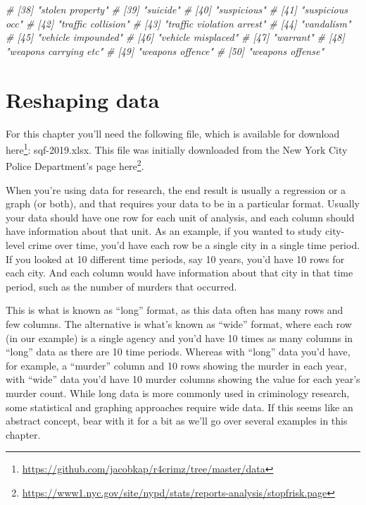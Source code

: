 \documentclass[
  a4paper,
]{krantz}
\makeatletter
\newenvironment{Shaded}{\begin{snugshade}}{\end{snugshade}}
\newcommand{\CommentTok}[1]{\textcolor[rgb]{0.56,0.35,0.01}{\textit{#1}}}
\renewcommand{\href}[2]{#2\footnote{\url{#1}}}
\newenvironment{kframe}{%
\medskip{}
\setlength{\fboxsep}{.8em}
 \def\at@end@of@kframe{}%
 \ifinner\ifhmode%
  \def\at@end@of@kframe{\end{minipage}}%
  \begin{minipage}{\columnwidth}%
 \fi\fi%
 \def\FrameCommand##1{\hskip\@totalleftmargin \hskip-\fboxsep
 \colorbox{shadecolor}{##1}\hskip-\fboxsep
     \hskip-\linewidth \hskip-\@totalleftmargin \hskip\columnwidth}%
 \MakeFramed {\advance\hsize-\width
   \@totalleftmargin\z@ \linewidth\hsize
   \@setminipage}}%
 {\par\unskip\endMakeFramed%
 \at@end@of@kframe}
\renewenvironment{Shaded}{\begin{kframe}}{\end{kframe}}
\makeatother
\begin{document}
\begin{Shaded}
\begin{Highlighting}[]
\CommentTok{\# [38] "stolen property"                           }
\CommentTok{\# [39] "suicide"                                   }
\CommentTok{\# [40] "suspicious"                                }
\CommentTok{\# [41] "suspicious occ"                            }
\CommentTok{\# [42] "traffic collision"                         }
\CommentTok{\# [43] "traffic violation arrest"                  }
\CommentTok{\# [44] "vandalism"                                 }
\CommentTok{\# [45] "vehicle impounded"                         }
\CommentTok{\# [46] "vehicle misplaced"                         }
\CommentTok{\# [47] "warrant"                                   }
\CommentTok{\# [48] "weapons carrying etc"                      }
\CommentTok{\# [49] "weapons offence"                           }
\CommentTok{\# [50] "weapons offense"}
\end{Highlighting}
\end{Shaded}

\hypertarget{reshaping}{%
\chapter{Reshaping data}\label{reshaping}}

For this chapter you'll need the following file, which is
available for download
\href{https://github.com/jacobkap/r4crimz/tree/master/data}{here}:
sqf-2019.xlsx. This file was initially downloaded from the
New York City Police Department's page
\href{https://www1.nyc.gov/site/nypd/stats/reports-analysis/stopfrisk.page}{here}.

When you're using data for research, the end result is
usually a regression or a graph (or both), and that requires
your data to be in a particular format. Usually your data
should have one row for each unit of analysis, and each
column should have information about that unit. As an
example, if you wanted to study city-level crime over time,
you'd have each row be a single city in a single time
period. If you looked at 10 different time periods, say 10
years, you'd have 10 rows for each city. And each column
would have information about that city in that time period,
such as the number of murders that occurred.

This is what is known as ``long'' format, as this data often
has many rows and few columns. The alternative is what's
known as ``wide'' format, where each row (in our example) is
a single agency and you'd have 10 times as many columns in
``long'' data as there are 10 time periods. Whereas with
``long'' data you'd have, for example, a ``murder'' column
and 10 rows showing the murder in each year, with ``wide''
data you'd have 10 murder columns showing the value for each
year's murder count. While long data is more commonly used
in criminology research, some statistical and graphing
approaches require wide data. If this seems like an abstract
concept, bear with it for a bit as we'll go over several
examples in this chapter.
\end{document}
